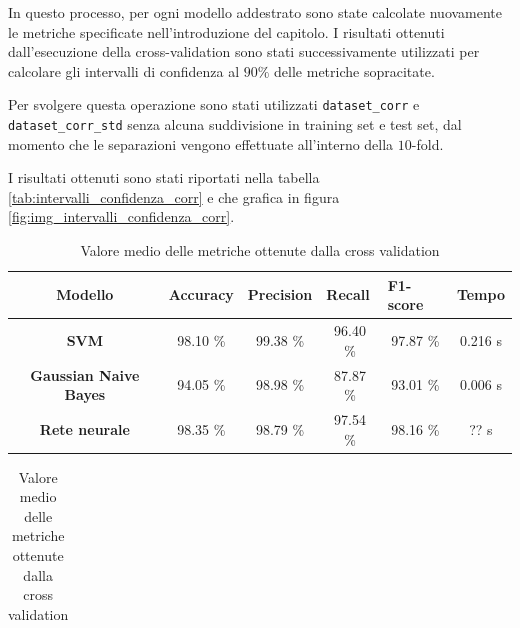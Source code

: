 In questo processo, per ogni modello addestrato sono state calcolate nuovamente
le metriche specificate nell'introduzione del capitolo. I risultati ottenuti
dall'esecuzione della cross-validation sono stati successivamente utilizzati per
calcolare gli intervalli di confidenza al $90\%$ delle metriche sopracitate.

Per svolgere questa operazione sono stati utilizzati \texttt{dataset\_corr} e
\texttt{dataset\_corr\_std} senza alcuna suddivisione in training set e test set,
dal momento che le separazioni vengono effettuate all'interno della $10$-fold.

I risultati ottenuti sono stati riportati nella tabella \ref{tab:intervalli_confidenza_corr}
e che grafica in figura \ref{fig:img_intervalli_confidenza_corr}.
\begin{table}[!ht]
    \begin{subtable}[h]{1\textwidth}
        \centering
        \begin{tabular}{@{}clllll@{}}
            \toprule
            \rowcolor[HTML]{EFEFEF}
            \textbf{Modello}                                      & \textbf{Accuracy}            & \textbf{Precision}           & \textbf{Recall}              & \textbf{F1-score}            & \textbf{Tempo}              \\ \midrule
            \cellcolor[HTML]{EFEFEF}\textbf{SVM}                  & \multicolumn{1}{c}{98.10 \%} & \multicolumn{1}{c}{99.38 \%} & \multicolumn{1}{c}{96.40 \%} & \multicolumn{1}{c}{97.87 \%} & \multicolumn{1}{c}{0.216 s} \\
            \cellcolor[HTML]{EFEFEF}\textbf{Gaussian Naive Bayes} & \multicolumn{1}{c}{94.05 \%} & \multicolumn{1}{c}{98.98 \%} & \multicolumn{1}{c}{87.87 \%} & \multicolumn{1}{c}{93.01 \%} & \multicolumn{1}{c}{0.006 s} \\
            \cellcolor[HTML]{EFEFEF}\textbf{Rete neurale}         & \multicolumn{1}{c}{98.35 \%} & \multicolumn{1}{c}{98.79 \%} & \multicolumn{1}{c}{97.54 \%} & \multicolumn{1}{c}{98.16 \%} & \multicolumn{1}{c}{?? s}    \\ \bottomrule
        \end{tabular}
        \caption{Valore medio delle metriche ottenute dalla cross validation}
        \label{tab:risultati_cross_val_corr}
    \end{subtable}
    \hfill
    \begin{subtable}[h]{1\textwidth}
        \centering
        \begin{tabular}{@{}cllll@{}}
            \toprule

\end{tabular}
\end{subtable}
\end{table}
